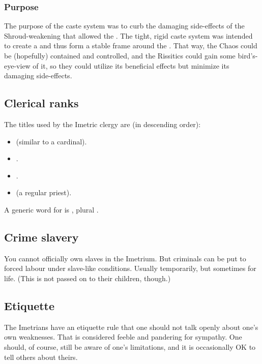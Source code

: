 \subsubsection{Purpose}
The purpose of the caste system was to curb the damaging side-effects of the Shroud-weakening that allowed the . 
The tight, rigid caste system was intended to create a  and thus form a stable frame around the . 
That way, the Chaos could be (hopefully) contained and controlled, and the Rissitics could gain some bird's-eye-view of it, so they could utilize its beneficial effects but minimize its damaging side-effects. 





\subsection{Clerical ranks}
The titles used by the Imetric clergy are (in descending order): 

\begin{itemize}
  \item \Laccorin{} (similar to a cardinal).
  \item \Ispan.
  \item \Telphan. 
  \item \Amra{} (a regular priest).
\end{itemize}

A generic word for  is \Stracos, plural \Stracoi. 




\subsection{Crime slavery}
You cannot officially own slaves in the Imetrium. 
But criminals can be put to forced labour under slave-like conditions. 
Usually temporarily, but sometimes for life. 
(This is not passed on to their children, though.)





\subsection{Etiquette}
The Imetrians have an etiquette rule that one should not talk openly about one's own weaknesses. 
That is considered feeble and pandering for sympathy. 
One should, of course, still be aware of one's limitations, and it is occasionally OK to tell others about theirs. 

